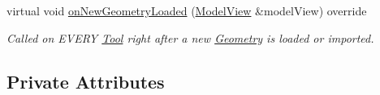 \begin{DoxyCompactItemize}
\mbox{\label{classpepr3d_1_1_paint_bucket_a3460bee5bb24684edcdeca08b76b4cc4}} 
virtual void \mbox{\hyperlink{classpepr3d_1_1_paint_bucket_a3460bee5bb24684edcdeca08b76b4cc4}{on\+New\+Geometry\+Loaded}} (\mbox{\hyperlink{classpepr3d_1_1_model_view}{Model\+View}} \&model\+View) override
\begin{DoxyCompactList}\small\item\em Called on E\+V\+E\+RY \mbox{\hyperlink{classpepr3d_1_1_tool}{Tool}} right after a new \mbox{\hyperlink{classpepr3d_1_1_geometry}{Geometry}} is loaded or imported. \end{DoxyCompactList}\end{DoxyCompactItemize}
\subsection*{Private Attributes}
